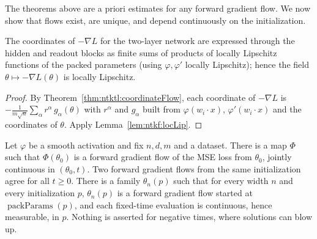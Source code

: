 The theorems above are a priori estimates for any forward gradient flow. We now show that flows exist, are unique, and depend continuously on the initialization.

\begin{lemma}\label{lem:ntktl:fieldLipschitz}
  \leanok
The coordinates of $-\nabla L$ for the two-layer network are expressed through the hidden and readout blocks as finite sums of products of locally Lipschitz functions of the packed parameters (using $\varphi,\varphi'$ locally Lipschitz); hence the field $\theta\mapsto-\nabla L(\theta)$ is locally Lipschitz.
\end{lemma}

\begin{proof}
  \leanok
By Theorem~\ref{thm:ntktl:coordinateFlow}, each coordinate of $-\nabla L$ is $-\frac1{m\sqrt n}\sum_\alpha r^\alpha\,g_\alpha(\theta)$ with $r^\alpha$ and $g_\alpha$ built from $\varphi(w_i\cdot x)$, $\varphi'(w_i\cdot x)$ and the coordinates of $\theta$. Apply Lemma~\ref{lem:ntkf:locLip}.
\end{proof}

\begin{theorem}\label{thm:ntktl:flowExists}
  \leanok
Let $\varphi$ be a smooth activation and fix $n,d,m$ and a dataset. There is a map $\Phi$ such that $\Phi(\theta_0)$ is a forward gradient flow of the MSE loss from $\theta_0$, jointly continuous in $(\theta_0,t)$. Two forward gradient flows from the same initialization agree for all $t\ge0$. There is a family
$\theta_n(p)$ such that for every width $n$ and every initialization $p$, $\theta_n(p)$ is a forward gradient flow started at $\operatorname{packParams}(p)$, and each fixed-time evaluation is continuous, hence measurable, in $p$. Nothing is asserted for negative times, where solutions can blow up.
\end{theorem}

